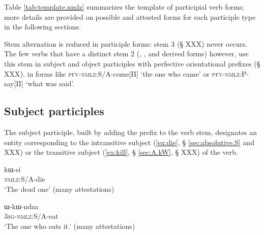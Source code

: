 Table \ref{tab:template.nmlz} summarizes the template of participial verb forms; more details are provided on possible and attested forms for each participle type in the following sections.

\begin{table}[h]
\caption{The template of participial verb forms in Japhug} \centering \label{tab:template.nmlz}
\end{table}

Stem alternation is reduced in participle forms: stem 3 (§ XXX) never occurs. The few verbs that have a distinct stem 2 (, ,  and derived forms) however, use this stem in subject and object participles with perfective orientational prefixes (§ XXX), in forms like  \textsc{pfv}-\textsc{nmlz}:S/A-come[II] `the one who came'
or  \textsc{pfv}-\textsc{nmlz}:P-say[II] `what was said'.
 

\subsection{Subject participles}
The subject participle, built by adding the prefix  to the verb stem, designates an entity corresponding to the intransitive subject (\ref{ex:die}, § \ref{sec:absolutive.S} and XXX) or the transitive subject (\ref{ex:kill}, § \ref{sec:A.kW}, § XXX) of the verb. 

 \begin{exe}
\ex \label{ex:kWsi}
\gll kɯ-si    \\
  \textsc{nmlz}:S/A-die \\
 \glt  `The dead one' (many attestations)
\end{exe}

 \begin{exe} 
\ex \label{ex:WkWndza}
\gll ɯ-kɯ-ndza    \\
  \textsc{3sg}-\textsc{nmlz}:S/A-eat \\
 \glt  `The one who eats it.' (many attestations)
\end{exe}

